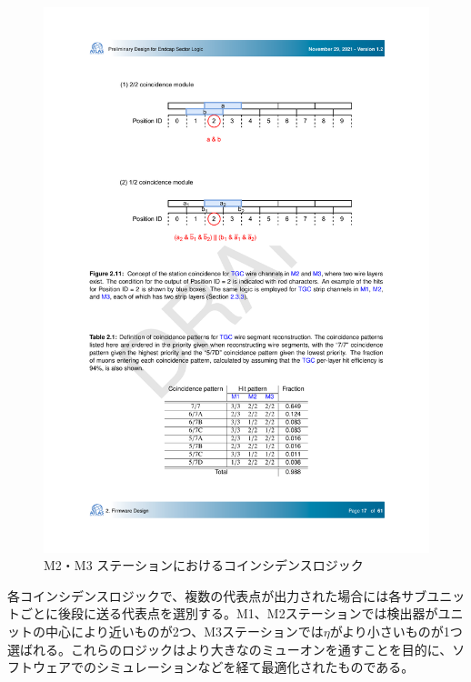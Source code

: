 \begin{figure} 
\centering
\includegraphics[width=16cm]{fig/SL/StationCoin_doublet.pdf}
\caption[M2・M3 ステーションにおけるコインシデンスロジック]{M2・M3 ステーションにおけるコインシデンスロジック}
\label{StationCoin_doublet}
\end{figure}

各コインシデンスロジックで、複数の代表点が出力された場合には各サブユニットごとに後段に送る代表点を選別する。M1、M2ステーションでは検出器がユニットの中心により近いものが2つ、M3ステーションでは$\eta$がより小さいものが1つ選ばれる。これらのロジックはより大きな\pt のミューオンを通すことを目的に、ソフトウェアでのシミュレーションなどを経て最適化されたものである。

